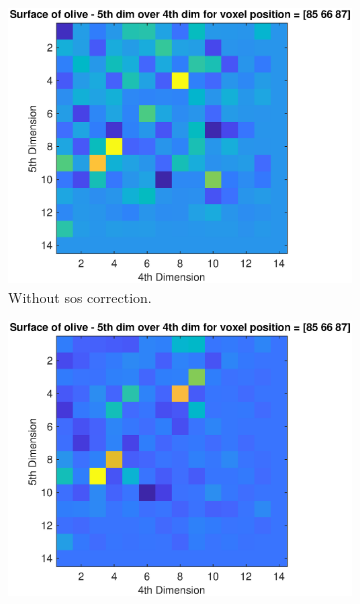 \begin{figure}[H]
     \centering
      \hfill
     \begin{subfigure}[b]{0.45\textwidth}
         \centering
         \includegraphics[width=1.02\textwidth,right]{Graphics/Results/14_vecs_sos_vs_noSos/5thdim_over4D_no_sos_stone.eps}
         \caption{Without \ac{sos} correction.}
         \label{fig:influence_sos_2_a}
     \end{subfigure}
          \hfill
     \begin{subfigure}[b]{0.47\textwidth}
         \centering
         \includegraphics[width=1.02\textwidth]{Graphics/Results/14_vecs_sos_vs_noSos/5thdim_over4D_with_sos_stone.eps}

\end{subfigure}
\end{figure}
